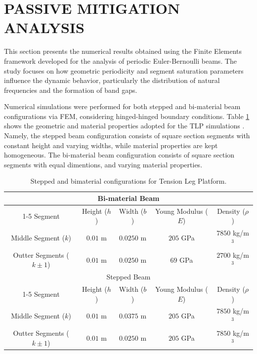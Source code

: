 \section{PASSIVE MITIGATION ANALYSIS}

This section presents the numerical results obtained using the Finite Elements framework developed for the analysis of periodic Euler-Bernoulli beams. The study focuses on how geometric periodicity and segment saturation parameters influence the dynamic behavior, particularly the distribution of natural frequencies and the formation of band gaps.

Numerical simulations were performed for both stepped and bi-material beam configurations via FEM, considering hinged-hinged boundary conditions. Table \ref{tab:sim1_values} shows the geometric and material properties adopted for the TLP simulations \cite{Domagalski2021}. Namely, the stepped beam configuration consists of square section segments with constant height and varying widths, while material properties are kept homogeneous. The bi-material beam configuration consists of square section segments with equal dimentions, and varying material properties.

\begin{table}[htbp]
\centering
\caption{Stepped and bimaterial configurations for Tension Leg Platform.}
\label{tab:sim1_values}
\begin{tabular}{ccccc}
\toprule
\multicolumn{5}{c}{Bi-material Beam} \\
\cmidrule(r){1-5}
Segment & Height ($h$) & Width ($b$) & Young Modulus ($E$) & Density ($\rho$) \\
\midrule
Middle Segment ($k$)         & $0.01$ m & $0.0250$ m & $205$ GPa & $7850$ kg/m$^3$ \\
Outter Segments ($k\pm1$) & $0.01$ m & $0.0250$ m & $69$ GPa  & $2700$ kg/m$^3$ \\
\midrule
\multicolumn{5}{c}{Stepped Beam} \\
\cmidrule(r){1-5}
Segment & Height ($h$) & Width ($b$) & Young Modulus ($E$) & Density ($\rho$) \\
\midrule
Middle Segment ($k$)         & $0.01$ m & $0.0375$ m & $205$ GPa & $7850$ kg/m$^3$ \\
Outter Segments ($k\pm1$) & $0.01$ m & $0.0250$ m & $205$ GPa & $7850$ kg/m$^3$ \\
\bottomrule
\end{tabular}
\end{table}

